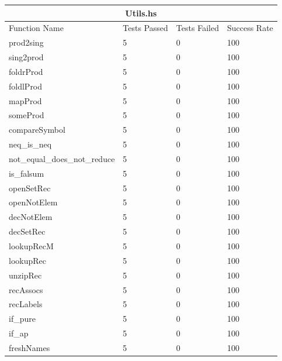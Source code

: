 \documentclass[12pt, svgnames]{article}
\begin{document}
\begin{adjustwidth}{-0.5cm}{}

\begin{tabular}[h!]{ |p{5cm}||p{3cm}|p{3cm}|p{3cm}|  }
    
    \hline
    \multicolumn{4}{|c|}{Utils.hs} \\
    \hline
    Function Name & Tests Passed & Tests Failed & Success Rate\\
    \hline
    prod2sing   & 5    &0&   100\\
    sing2prod&   5  & 0   &100\\
    foldrProd &5 & 0&  100\\
    foldlProd &5 & 0&  100\\
    mapProd&   5  & 0&100\\
    someProd& 5  & 0   &100\\
    compareSymbol& 5  & 0&100\\
    neq\_is\_neq& 5  & 0&100\\
    not\_equal\_does\_not\_reduce& 5  & 0&100\\
    is\_falsum& 5  & 0&100\\
    openSetRec& 5  & 0&100\\
    openNotElem& 5  & 0&100\\
    decNotElem& 5  & 0&100\\
    decSetRec& 5  & 0&100\\
    lookupRecM& 5  & 0&100\\
    lookupRec& 5  & 0&100\\
    unzipRec& 5  & 0&100\\
    recAssocs& 5  & 0&100\\
    recLabels& 5  & 0&100\\
    if\_pure& 5  & 0&100\\
    if\_ap& 5  & 0&100\\
    freshNames& 5  & 0 &100\\
    \hline
\end{tabular}

\end{adjustwidth}
\end{document}
